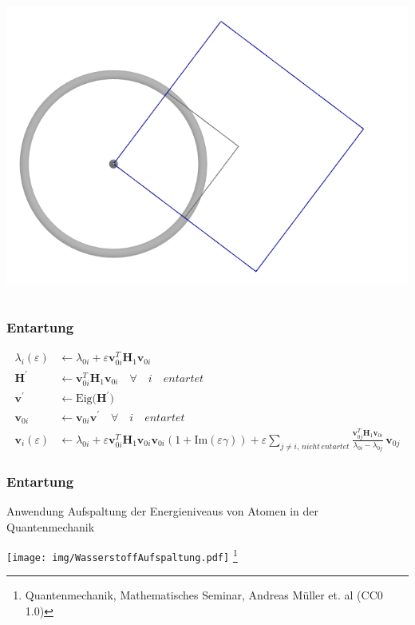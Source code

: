\documentclass[ngerman, aspectratio=169]{beamer}
\begin{document}
\begin{frame}
\begin{columns}
\begin{column}{0.40\textwidth}
\begin{center}
					\includegraphics[scale=0.25]{img/entartung2.png}
				\end{center}
			\end{column}
		\end{columns}
	\end{frame}

	\begin{frame}
        \frametitle{Entartung}

		\begin{align*}
			\lambda_i(\varepsilon)
			& \gets
			\lambda_{0i} + \varepsilon \bm v_{0i}^T \bm H_1 \bm v_{0i}\\
			\bm H^\prime & \gets \bm v_{0i}^T \bm H_1 \bm v_{0i} \quad \forall \quad i \quad entartet \\
			\bm v^\prime & \gets \mathrm{Eig} \Big( \bm H^\prime \Big) \\
			\bm v_{0i} & \gets \bm v_{0i} \bm v^\prime  \quad \forall \quad i \quad entartet \\
			\bm v_i(\varepsilon)
			& \gets
			\lambda_{0i} + \varepsilon \bm v_{0i}^T \bm H_1 \bm v_{0i}
				\bm v_{0i} ( 1 + \mathrm{Im}(\varepsilon \gamma) ) + \varepsilon \sum_{j \neq i, \,nicht\,entartet}
				\frac{\bm v_{0j}^T \bm H_1 \bm v_{0i}}{\lambda_{0i} - \lambda_{0j}}
				\, \bm v_{0j}
		\end{align*}
		
	\end{frame}

	\begin{frame}
        \frametitle{Entartung}
		\begin{block}{Anwendung}
			Aufspaltung der Energieniveaus von Atomen in der Quantenmechanik
			\begin{center}
				\texttt{[image: img/WasserstoffAufspaltung.pdf]}
				\footnote{Quantenmechanik, Mathematisches Seminar, Andreas Müller et. al (CC0 1.0)}
			\end{center}
		\end{block}
	\end{frame}
\end{document}
